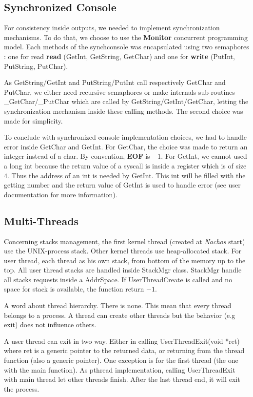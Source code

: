 \subsection{Synchronized Console}

For consistency inside outputs, we needed to implement synchronization
mechanisms. To do that, we choose to use the \textbf{Monitor} concurrent
programming model. Each methods of the synchconsole was encapsulated using two
semaphores : one for read \textbf{read} (GetInt, GetString, GetChar) and one for
\textbf{write} (PutInt, PutString, PutChar).

As GetString/GetInt and PutString/PutInt call respectively GetChar and PutChar,
we either need recursive semaphores or make internals sub-routines
\_GetChar/\_PutChar which are called by GetString/GetInt/GetChar, letting the
synchronization mechanism inside these calling methods.
The second choice was made for simplicity.

To conclude with synchronized console implementation choices, we had to handle
error inside GetChar and GetInt.
For GetChar, the choice was made to return an integer instead of a char. By
convention, \textbf{EOF} is $-1$.
For GetInt, we cannot used a long int because the return value of a syscall is
inside a register which is of size $4$. Thus the address of an int is needed by
GetInt. This int will be filled with the getting number and the return value of
GetInt is used to handle error (see user documentation for more information).

\subsection{Multi-Threads}

Concerning stacks management, the first kernel thread (created at \emph{Nachos}
start) use the UNIX-process stack. Other kernel threads use heap-allocated
stack. For user thread, each thread as his own stack, from bottom of the memory
up to the top. All user thread stacks are handled inside StackMgr
class. StackMgr handle all stacks requests inside a AddrSpace. If
UserThreadCreate is called and no space for stack is available, the function
return $-1$.

A word about thread hierarchy. There is none. This mean that every thread
belongs to a process. A thread can create other threads but the behavior (e.g
exit) does not influence others.

A user thread can exit in two way. Either in calling \textrm{UserThreadExit(void *ret)}
where ret is a generic pointer to the returned data, or returning from the
thread function (also a generic pointer). One exception is for the first
thread (the one with the main function). As pthread implementation, calling
\textrm{UserThreadExit} with main thread let other threads finish. After the last
thread end, it will exit the process.

